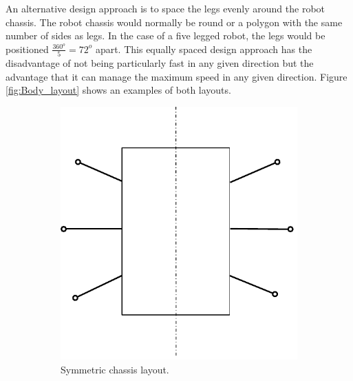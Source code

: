 An alternative design approach is to space the legs evenly around the robot chassis. The robot chassis would normally be round or a polygon with the same number of sides as legs. In the case of a five legged robot, the legs would be positioned $\frac{360^o}{5} = 72^o $ apart.
This equally spaced design approach has the disadvantage of not being particularly fast in any given direction but the advantage that it can manage the maximum speed in any given direction. Figure \ref{fig:Body_layout} shows an examples of both layouts.
\begin{figure}[t!]
    \centering
    \begin{subfigure}[t]{0.5\textwidth}
        \centering
        \includegraphics[scale = 0.6]{pics/Body_layout_hex.pdf}
        \caption{Symmetric chassis layout.}
    \end{subfigure}%
    ~ 
    \begin{subfigure}[t]{0.5\textwidth}
        \centering

\end{subfigure}
\end{figure}
